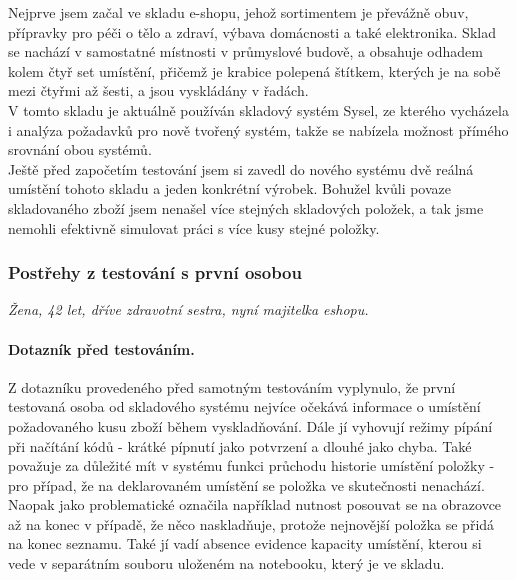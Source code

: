 Nejprve jsem začal ve skladu e-shopu, jehož sortimentem je převážně obuv, přípravky pro péči o tělo a zdraví, výbava domácnosti a také elektronika. Sklad se nachází v samostatné místnosti v průmyslové budově, a obsahuje odhadem kolem čtyř set umístění, přičemž  je krabice polepená štítkem, kterých je na sobě mezi čtyřmi až šesti, a jsou vyskládány v řadách.\\
V tomto skladu je aktuálně používán skladový systém Sysel, ze kterého vycházela i analýza požadavků pro nově tvořený systém, takže se nabízela možnost přímého srovnání obou systémů.\\
Ještě před započetím testování jsem si zavedl do nového systému dvě reálná umístění tohoto skladu a jeden konkrétní výrobek. Bohužel kvůli povaze skladovaného zboží jsem nenašel více stejných skladových položek, a tak jsme nemohli efektivně simulovat práci s více kusy stejné položky.


\subsubsection{Postřehy z testování s první osobou}
\emph{Žena, 42 let, dříve zdravotní sestra, nyní majitelka eshopu.}

\paragraph{Dotazník před testováním.} Z dotazníku provedeného před samotným testováním vyplynulo, že první testovaná osoba od skladového systému nejvíce očekává informace o umístění požadovaného kusu zboží během vyskladňování. Dále jí vyhovují režimy pípání při načítání kódů - krátké pípnutí jako potvrzení a dlouhé jako chyba. Také považuje za důležité mít v systému funkci průchodu historie umístění položky - pro případ, že na deklarovaném umístění se položka ve skutečnosti nenachází. Naopak jako problematické označila například nutnost posouvat se na obrazovce až na konec v případě, že něco naskladňuje, protože nejnovější položka se přidá na konec seznamu. Také jí vadí absence evidence kapacity umístění, kterou si vede v separátním souboru uloženém na notebooku, který je ve skladu.\\

